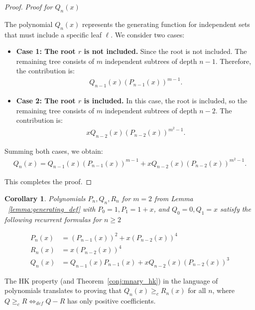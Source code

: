 \documentclass[10pt]{amsart}
\newtheorem{corollary}[theorem]{Corollary}
\theoremstyle{definition}
\begin{document}
\begin{proof}
	\textit{Proof for $Q_n(x)$}

	The polynomial $Q_n(x)$ represents the generating function for independent sets that must include a specific leaf $\ell$. We consider two cases:

	\begin{itemize}
		\item \textbf{Case 1: The root $r$ is not included.}
		      Since the root is not included. The remaining tree consists of $m$ independent subtrees of depth $n-1$. Therefore, the contribution is:
		      \begin{align*}
			      Q_{n-1}(x) (P_{n-1}(x))^{m - 1}.
		      \end{align*}
		\item \textbf{Case 2: The root $r$ is included.}
		      In this case, the root is included, so the remaining tree consists of $m$ independent subtrees of depth $n-2$. The contribution is:
		      \begin{align*}
			      x Q_{n-2}(x) (P_{n-2}(x))^{m^2 - 1}.
		      \end{align*}
	\end{itemize}

	Summing both cases, we obtain:
	\begin{align*}
		Q_n(x) = Q_{n-1}(x) (P_{n-1}(x))^{m - 1} + x Q_{n-2}(x) (P_{n-2}(x))^{m^2-1}.
	\end{align*}

	This completes the proof.
\end{proof}

\begin{corollary}\label{cor:gen_func_binary}
	Polynomials $P_n, Q_n, R_n$ for $m = 2$ from Lemma ~\ref{lemma:generating_def} with $P_{0}=1, P_1=1+x$, and $Q_{0}=0, Q_1=x$ satisfy the following recurrent formulas for $n\geq 2$

	\begin{align*}
		P_n(x) & = (P_{n - 1}(x))^2 + x(P_{n - 2}(x))^4                     \\
		R_n(x) & = x(P_{n - 2}(x))^4                                        \\
		Q_n(x) & = Q_{n - 1}(x)P_{n - 1}(x) + xQ_{n - 2}(x)(P_{n - 2}(x))^3
	\end{align*}
\end{corollary}

The HK property (and Theorem~\ref{conj:mnary_hk}) in the language of polynomials translates to proving that $Q_{n}(x)\geq_{c} R_{n}(x)$ for all $n$, where $Q\geq _c R \Leftrightarrow_{def} Q-R$ has only positive coefficients.
\end{document}
